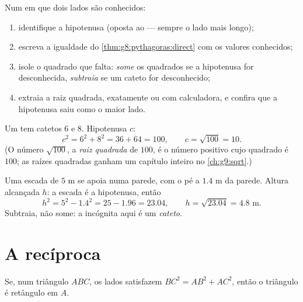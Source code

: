 \begin{method}\label{met:g8:pythagoras:compute}
Num  em que dois lados são conhecidos:
\begin{enumerate}
  \item identifique a hipotenusa (oposta ao  --- sempre o
        lado mais longo);
  \item escreva a igualdade do \cref{thm:g8:pythagoras:direct} com os
        valores conhecidos;
  \item isole o quadrado que falta: \emph{some} os quadrados se a
        hipotenusa for desconhecida, \emph{subtraia} se um cateto for
        desconhecido;
  \item extraia a raiz quadrada, exatamente ou com calculadora, e
        confira que a hipotenusa saiu como o maior lado.
\end{enumerate}
\end{method}

\begin{example}\label{ex:g8:pythagoras:hypotenuse}
Um  tem catetos $6$ e $8$. Hipotenusa $c$:
\[
c^2 = 6^2 + 8^2 = 36 + 64 = 100,
\qquad
c = \sqrt{100} = 10 .
\]
(O número $\sqrt{100}$, a \emph{raiz quadrada} de $100$, é o número
positivo cujo quadrado é $100$; as raízes quadradas ganham um capítulo
inteiro no \cref{ch:g9:sqrt}.)
\end{example}

\begin{example}\label{ex:g8:pythagoras:leg}
Uma escada de $5$ m se apoia numa parede, com o pé a $1.4$ m da
parede. Altura alcançada $h$: a escada é a hipotenusa, então
\[
h^2 = 5^2 - 1.4^2 = 25 - 1.96 = 23.04,
\qquad
h = \sqrt{23.04} = 4.8 \text{ m}.
\]
Subtraia, não some: a incógnita aqui é um \emph{cateto}.
\end{example}

\section{A recíproca}

\begin{theorem}\label{thm:g8:pythagoras:converse}
Se, num triângulo $ABC$, os lados satisfazem $BC^2 = AB^2 + AC^2$,
então o triângulo é retângulo em $A$.
\end{theorem}
\admitted

